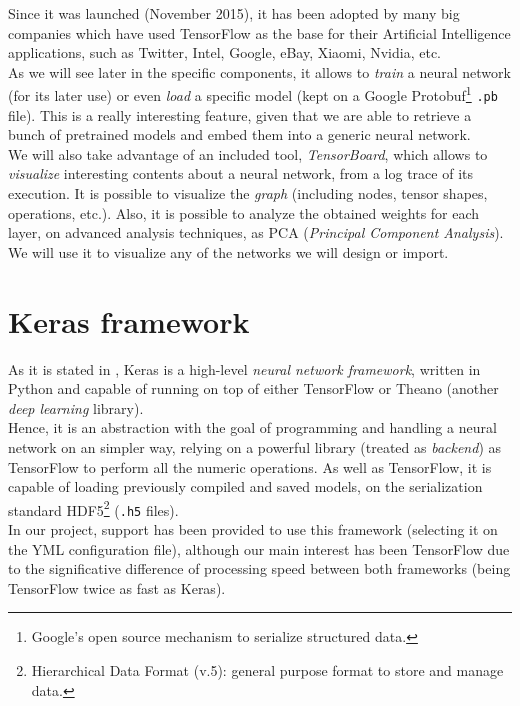	Since it was launched (November 2015), it has been adopted by many big companies which have used TensorFlow as the base for their Artificial Intelligence applications, such as Twitter, Intel, Google, eBay, Xiaomi, Nvidia, etc.\\
	
	As we will see later in the specific components, it allows to \emph{train} a neural network (for its later use) or even \emph{load} a specific model (kept on a Google Protobuf\footnote{Google's open source mechanism to serialize structured data.} \texttt{.pb} file). This is a really interesting feature, given that we are able to retrieve a bunch of pretrained models and embed them into a generic neural network.\\
	
	We will also take advantage of an included tool, \emph{TensorBoard}, which allows to \emph{visualize} interesting contents about a neural network, from a log trace of its execution. It is possible to visualize the \emph{graph} (including nodes, tensor shapes, operations, etc.). Also, it is possible to analyze the obtained weights for each layer, on advanced analysis techniques, as PCA (\emph{Principal Component Analysis}). We will use it to visualize any of the networks we will design or import.

\section{Keras framework}
	As it is stated in \cite{dpascualhe}, Keras is a high-level \emph{neural network framework}, written in Python and capable of running on top of either TensorFlow or Theano (another \emph{deep learning} library).\\
	
	Hence, it is an abstraction with the goal of programming and handling a neural network on an simpler way, relying on a powerful library (treated as \emph{backend}) as TensorFlow to perform all the numeric operations. As well as TensorFlow, it is capable of loading previously compiled and saved models, on the serialization standard HDF5\footnote{Hierarchical Data Format (v.5): general purpose format to store and manage data.} (\texttt{.h5} files).\\
	
	In our project, support has been provided to use this framework (selecting it on the YML configuration file), although our main interest has been TensorFlow due to the significative difference of processing speed between both frameworks (being TensorFlow twice as fast as Keras).

